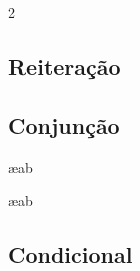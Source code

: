 \ifHTMLtarget\else
%
\renewenvironment{fitchproof}[1][]
  {\begin{flushleft}\small\begin{nd}[#1]}
  {\end{nd}\end{flushleft}}
\fi
\begin{multicols}{2}
\subsection*{Reiteração}

\begin{fitchproof}
	 
\end{fitchproof}

\subsection*{Conjunção}

\begin{fitchproof}
	 
\end{fitchproof}
\begin{fitchproof}
	 \ae{ab}
\end{fitchproof}
\begin{fitchproof}
	 \ae{ab}
\end{fitchproof}

\subsection*{Condicional}

\begin{fitchproof}
	\open
		\AS
	\close
\end{fitchproof}
\begin{fitchproof}
	 
\end{fitchproof}


\end{multicols}
